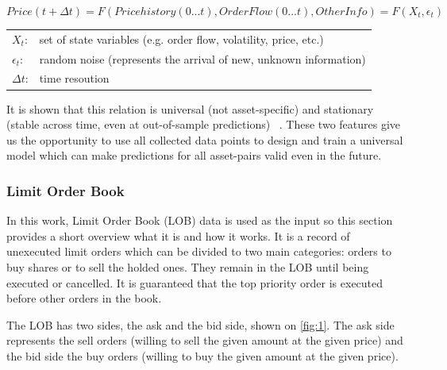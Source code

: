 \documentclass[11pt,a4paper,oneside]{article}
\begin{document}
  \begin{equation}
    Price(t+\Delta t) = F(Price history(0...t), Order Flow(0...t), Other Info) = F(X_{t}, \epsilon_{t})
    \label{eq:price_form}
  \end{equation}


  \begin{center}
    \begin{tabular}{l l}
      $X_{t}$: & set of state variables (e.g. order flow, volatility, price, etc.) \\
      $\epsilon_{t}$: & random noise (represents the arrival of new, unknown information) \\
      $\Delta t$: & time resoution
    \end{tabular}
  \end{center}

  \bigskip

  It is shown that this relation is universal (not asset-specific) and stationary (stable across time, even at 
  out-of-sample predictions) ~\cite{univ}. These two features give us the opportunity to use all collected data points 
  to design and train a universal model which can make predictions for all asset-pairs valid even in the future.

  \subsubsection{Limit Order Book}
  \label{sec:limit_order_book}
  
  In this work, Limit Order Book (LOB) data is used as the input so this section provides a short overview what it is 
  and how it works. It is a record of unexecuted limit orders which can be divided to two main categories: orders to buy 
  shares or to sell the holded ones. They remain in the LOB until being executed or cancelled. It is guaranteed that the 
  top priority order is executed before other orders in the book.
  
  The LOB has two sides, the ask and the bid side, shown on \autoref{fig:1}. The ask side represents the sell orders 
  (willing to sell the given amount at the given price) and the bid side the buy orders (willing to buy the given amount 
  at the given price).
\end{document}
